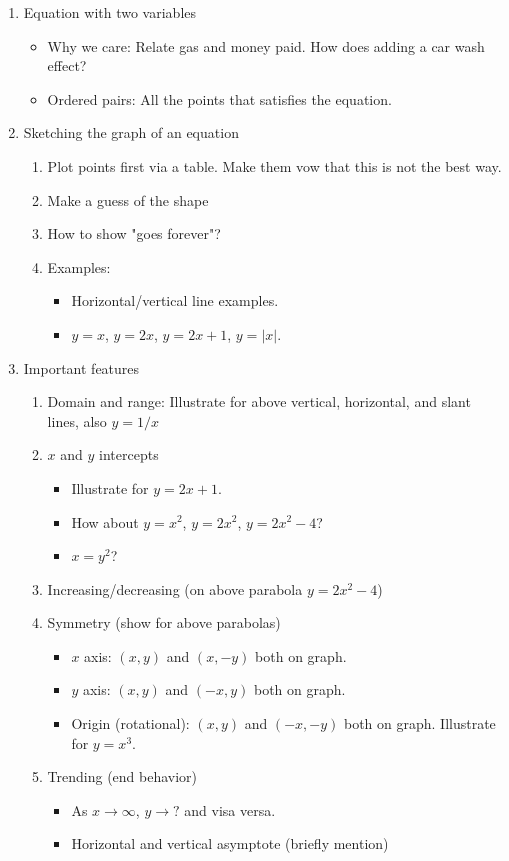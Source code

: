 \documentclass{article}
\begin{document}
\begin{enumerate}
\item Equation with two variables
\begin{itemize}
\item Why we care: Relate gas and money paid. How does adding a car wash effect?
\item Ordered pairs: All the points that satisfies the equation. 
\end{itemize}

\item Sketching the graph of an equation
\begin{enumerate}
\item Plot points first via a table. Make them vow that this is not the best way.
\item Make a guess of the shape
\item How to show "goes forever"?
\item Examples:
\begin{itemize}
\item Horizontal/vertical line examples. 
\item $y=x$, $y=2x$, $y=2x+1$, $y=|x|$.
\end{itemize}
\end{enumerate} 

\item Important features
\begin{enumerate}
\item Domain and range: Illustrate for above vertical, horizontal, and slant lines, also $y = 1/x$
\item $x$ and $y$ intercepts 
\begin{itemize}
\item Illustrate for $y=2x+1$.
\item How about $y=x^2$, $y=2x^2$, $y=2x^2-4$?
\item $x=y^2$?
\end{itemize}
\item Increasing/decreasing (on above parabola $y=2x^2-4$)
\item Symmetry (show for above parabolas)
\begin{itemize}
\item $x$ axis: $(x,y)$ and $(x,-y)$ both on graph. 
\item $y$ axis: $(x,y)$ and $(-x,y)$ both on graph. 
\item Origin (rotational): $(x,y)$ and $(-x,-y)$ both on graph. Illustrate for $y=x^3$. 
\end{itemize}
\item Trending (end behavior)
\begin{itemize}
\item As $x\rightarrow \infty$, $y\rightarrow ?$ and visa versa.
\item Horizontal and vertical asymptote (briefly mention)
\end{itemize}
\end{enumerate}


\end{enumerate}
\end{document}
